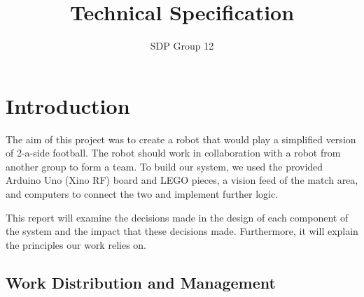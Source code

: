 \documentclass[12pt,a4paper,titlepage]{article}
\author{SDP Group 12}
\title{Technical Specification}
\begin{document}
\maketitle

\tableofcontents
\clearpage





\section{Introduction}

The aim of this project was to create a robot that would play a simplified version of 2-a-side football. The robot should work in collaboration with a robot from another group to form a team. To build our system, we used the provided Arduino Uno (Xino RF) board and LEGO pieces, a vision feed of the match area, and computers to connect the two and implement further logic.

This report will examine the decisions made in the design of each component of the system and the impact that these decisions made. Furthermore, it will explain the principles our work relies on.

\subsection{Work Distribution and Management}
\end{document}
